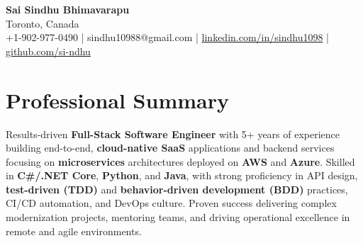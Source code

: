 \documentclass[letterpaper,11pt]{article}
\begin{document}
\begin{center}
  {\Large \textbf{Sai Sindhu Bhimavarapu}} \\
  Toronto, Canada \\
  +1-902-977-0490 \enspace | \enspace sindhu10988@gmail.com \enspace | \enspace \href{https://www.linkedin.com/in/sindhu1098/}{linkedin.com/in/sindhu1098} \enspace | \enspace \href{https://github.com/si-ndhu}{github.com/si-ndhu}
\end{center}

\section{Professional Summary}
  \begin{itemize}[leftmargin=0.15in, label={}]
    \small{\item{
     Results-driven \textbf{Full-Stack Software Engineer} with 5+ years of experience building end-to-end, \textbf{cloud-native SaaS} applications and backend services focusing on \textbf{microservices} architectures deployed on \textbf{AWS} and \textbf{Azure}. Skilled in \textbf{C\#/.NET Core}, \textbf{Python}, and \textbf{Java}, with strong proficiency in API design, \textbf{test-driven (TDD)} and \textbf{behavior-driven development (BDD)} practices, CI/CD automation, and DevOps culture. Proven success delivering complex modernization projects, mentoring teams, and driving operational excellence in remote and agile environments.
    }}
  \end{itemize}
\vspace{-16pt}

\end{document}
